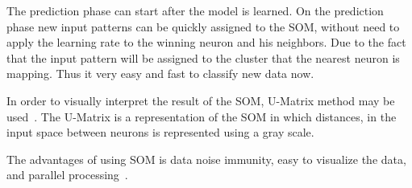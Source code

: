 The prediction phase can start after the model is learned. On the prediction phase new input patterns can be quickly assigned to the \ac{SOM}, without need to apply the learning rate to the winning neuron and his neighbors. Due to the fact that the input pattern will be assigned to the cluster that the nearest neuron is mapping. Thus it very easy and fast to classify new data now.

%

In order to visually interpret the result of the \ac{SOM}, \ac{U-Matrix} method may be used~\citep{Bacao2005}. The \ac{U-Matrix} is a representation of the \ac{SOM} in which distances, in the input space between neurons is represented using a gray scale.

The advantages of using \ac{SOM} is data noise immunity, easy to visualize the data, and parallel processing~\cite{Liu2012b}.
 
